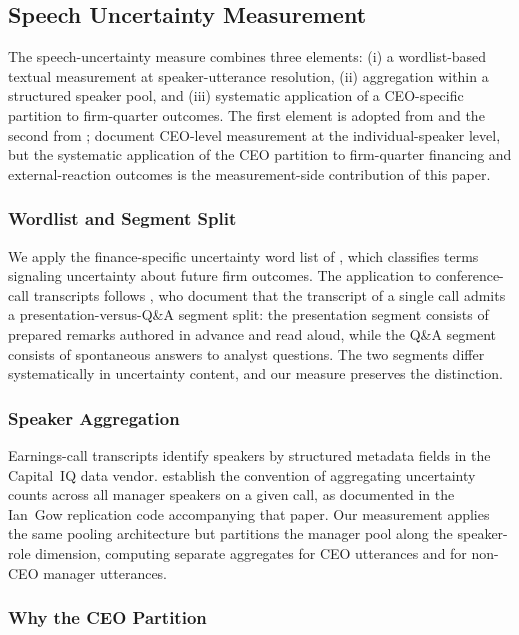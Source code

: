 \subsection{Speech Uncertainty Measurement}
\label{sec:framework:measurement}

The speech-uncertainty measure combines three elements: (i) a wordlist-based textual measurement at speaker-utterance resolution, (ii) aggregation within a structured speaker pool, and (iii) systematic application of a CEO-specific partition to firm-quarter outcomes. The first element is adopted from  and the second from ;  document CEO-level measurement at the individual-speaker level, but the systematic application of the CEO partition to firm-quarter financing and external-reaction outcomes is the measurement-side contribution of this paper.

\subsubsection{Wordlist and Segment Split}

We apply the finance-specific uncertainty word list of , which classifies terms signaling uncertainty about future firm outcomes. The application to conference-call transcripts follows , who document that the transcript of a single call admits a presentation-versus-Q\&A segment split: the presentation segment consists of prepared remarks authored in advance and read aloud, while the Q\&A segment consists of spontaneous answers to analyst questions. The two segments differ systematically in uncertainty content, and our measure preserves the distinction.

\subsubsection{Speaker Aggregation}

Earnings-call transcripts identify speakers by structured metadata fields in the Capital~IQ data vendor.  establish the convention of aggregating uncertainty counts across all manager speakers on a given call, as documented in the Ian~Gow replication code accompanying that paper. Our measurement applies the same pooling architecture but partitions the manager pool along the speaker-role dimension, computing separate aggregates for CEO utterances and for non-CEO manager utterances.

\subsubsection{Why the CEO Partition}

